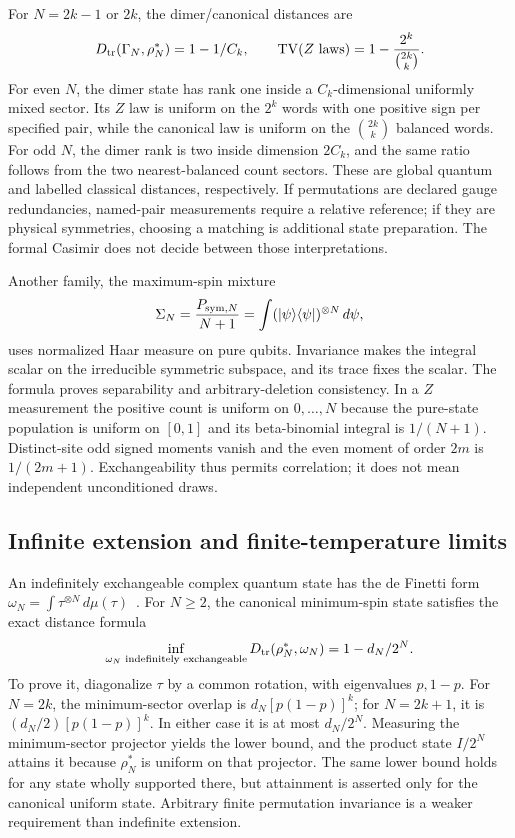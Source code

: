 For $N=2k-1$ or $2k$, the dimer/canonical distances are
\[
 D_{\rm tr}(\Gamma_N,\rho_N^*)=1-1/C_k,
 \qquad
 \operatorname{TV}(Z\text{ laws})=1-\frac{2^k}{\binom{2k}k}.
\]
For even $N$, the dimer state has rank one inside a $C_k$-dimensional uniformly mixed sector. Its $Z$ law is uniform on the $2^k$ words with one positive sign per specified pair, while the canonical law is uniform on the $\binom{2k}k$ balanced words. For odd $N$, the dimer rank is two inside dimension $2C_k$, and the same ratio follows from the two nearest-balanced count sectors. These are global quantum and labelled classical distances, respectively. If permutations are declared gauge redundancies, named-pair measurements require a relative reference; if they are physical symmetries, choosing a matching is additional state preparation. The formal Casimir does not decide between those interpretations.

Another family, the maximum-spin mixture
\[
 \Sigma_N=\frac{P_{{\rm sym},N}}{N+1}
 =\int(|\psi\rangle\langle\psi|)^{\otimes N}\,d\psi,
\]
uses normalized Haar measure on pure qubits. Invariance makes the integral scalar on the irreducible symmetric subspace, and its trace fixes the scalar. The formula proves separability and arbitrary-deletion consistency. In a $Z$ measurement the positive count is uniform on $0,\ldots,N$ because the pure-state population is uniform on $[0,1]$ and its beta-binomial integral is $1/(N+1)$. Distinct-site odd signed moments vanish and the even moment of order $2m$ is $1/(2m+1)$. Exchangeability thus permits correlation; it does not mean independent unconditioned draws.

\subsection{Infinite extension and finite-temperature limits}
\label{qua:exchangeability}
An indefinitely exchangeable complex quantum state has the de Finetti form
$\omega_N=\int\tau^{\otimes N}\,d\mu(\tau)$~\cite{caves}.
For $N\ge2$, the canonical minimum-spin state satisfies the exact distance formula
\begin{equation}
 \inf_{\omega_N\text{ indefinitely exchangeable}}
 D_{\rm tr}(\rho_N^*,\omega_N)=1-d_N/2^N.
 \label{qua:distanceexchange}
\end{equation}
To prove it, diagonalize $\tau$ by a common rotation, with eigenvalues $p,1-p$. For $N=2k$, the minimum-sector overlap is $d_N[p(1-p)]^k$; for $N=2k+1$, it is $(d_N/2)[p(1-p)]^k$. In either case it is at most $d_N/2^N$. Measuring the minimum-sector projector yields the lower bound, and the product state $I/2^N$ attains it because $\rho_N^*$ is uniform on that projector. The same lower bound holds for any state wholly supported there, but attainment is asserted only for the canonical uniform state. Arbitrary finite permutation invariance is a weaker requirement than indefinite extension.

